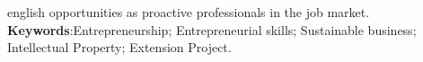 \begin{resumo}[Abstract]
\begin{otherlanguage*}{english}
opportunities as proactive professionals in the job market.
\textbf{Keywords}:Entrepreneurship; Entrepreneurial skills; Sustainable business; Intellectual Property; Extension Project.
 \end{otherlanguage*}
\end{resumo}